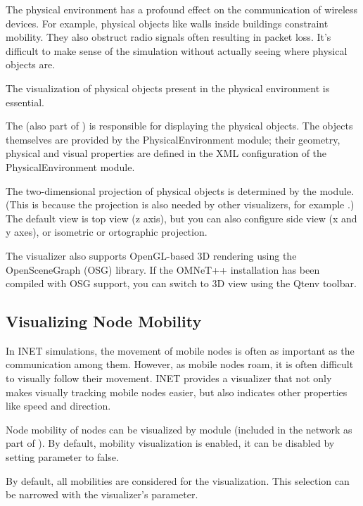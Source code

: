 The physical environment has a profound effect on the communication of wireless
devices. For example, physical objects like walls inside buildings constraint
mobility. They also obstruct radio signals often resulting in packet loss. It's
difficult to make sense of the simulation without actually seeing where physical
objects are.

The visualization of physical objects present in the physical environment is
essential.

The  (also part of ) is
responsible for displaying the physical objects. The objects themselves are
provided by the PhysicalEnvironment module; their geometry, physical and visual
properties are defined in the XML configuration of the PhysicalEnvironment
module.

The two-dimensional projection of physical objects is determined by the
 module. (This is because the projection is also needed by
other visualizers, for example .) The default view is top view
(z axis), but you can also configure side view (x and y axes), or isometric or
ortographic projection.

The visualizer also supports OpenGL-based 3D rendering using the OpenSceneGraph
(OSG) library. If the OMNeT++ installation has been compiled with OSG
support, you can switch to 3D view using the Qtenv toolbar.

\subsection{Visualizing Node Mobility}

In INET simulations, the movement of mobile nodes is often as important as the
communication among them. However, as mobile nodes roam, it is often difficult
to visually follow their movement. INET provides a visualizer that not only
makes visually tracking mobile nodes easier, but also indicates other properties
like speed and direction.

Node mobility of nodes can be visualized by  module
(included in the network as part of ). By default,
mobility visualization is enabled, it can be disabled by setting
 parameter to false.

By default, all mobilities are considered for the visualization. This selection
can be narrowed with the visualizer's  parameter.

